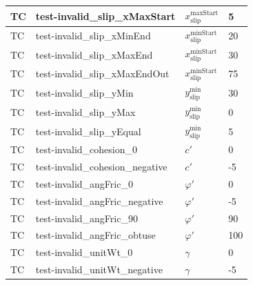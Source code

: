 \documentclass[12pt, titlepage]{article}
\newcounter{testnum} %
\begin{document}
\begin{longtable}{  l  p{5cm}  l  p{5cm}  }
	\hline
	TC{testnum}\thetestnum \label{TC_InvalidSlipXMaxStart} & 
	test-invalid\_slip\_xMaxStart & ${x_\text{slip}^\text{maxStart}}$ & 5\\ 
	\hline
	TC{testnum}\thetestnum \label{TC_InvalidSlipXMinEnd} & 
	test-invalid\_slip\_xMinEnd & ${x_\text{slip}^\text{minStart}}$ & 20\\ 
	\hline
	TC{testnum}\thetestnum \label{TC_InvalidSlipXMaxEnd} & 
	test-invalid\_slip\_xMaxEnd & ${x_\text{slip}^\text{minStart}}$ & 30\\ 
	\hline
	TC{testnum}\thetestnum \label{TC_InvalidSlipXMaxEndOut} & 
	test-invalid\_slip\_xMaxEndOut & ${x_\text{slip}^\text{minStart}}$ & 75\\ 
	\hline
	TC{testnum}\thetestnum \label{TC_InvalidSlipYMin} & 
	test-invalid\_slip\_yMin & ${y_\text{slip}^\text{min}}$ & 30\\ 
	\hline
	TC{testnum}\thetestnum \label{TC_InvalidSlipYMax} & 
	test-invalid\_slip\_yMax & ${y_\text{slip}^\text{min}}$ & 0\\ 
	\hline
	TC{testnum}\thetestnum \label{TC_InvalidSlipYEqual} & 
	test-invalid\_slip\_yEqual & ${y_\text{slip}^\text{min}}$ & 5\\ 
	\hline
	TC{testnum}\thetestnum \label{TC_InvalidCohesion0} & 
	test-invalid\_cohesion\_0 & $c'$ & 0\\ 
	\hline
	TC{testnum}\thetestnum \label{TC_InvalidCohesionNegative} & 
	test-invalid\_cohesion\_negative & $c'$ & -5\\ 
	\hline
	TC{testnum}\thetestnum \label{TC_InvalidAngFric0} & 
	test-invalid\_angFric\_0 & $\varphi'$ & 0\\ 
	\hline
	TC{testnum}\thetestnum \label{TC_InvalidAngFricNegative} & 
	test-invalid\_angFric\_negative & $\varphi'$ & -5\\ 
	\hline
	TC{testnum}\thetestnum \label{TC_InvalidAngFric90} & 
	test-invalid\_angFric\_90 & $\varphi'$ & 90\\ 
	\hline
	TC{testnum}\thetestnum \label{TC_InvalidAngFricObtuse} & 
	test-invalid\_angFric\_obtuse & $\varphi'$ & 100\\ 
	\hline
	TC{testnum}\thetestnum \label{TC_InvalidUnitWt0} & 
	test-invalid\_unitWt\_0 & $\gamma$ & 0\\ 
	\hline
	TC{testnum}\thetestnum \label{TC_InvalidUnitWtNegative} & 
	test-invalid\_unitWt\_negative & $\gamma$ & -5\\ 

\end{longtable}
\end{document}
